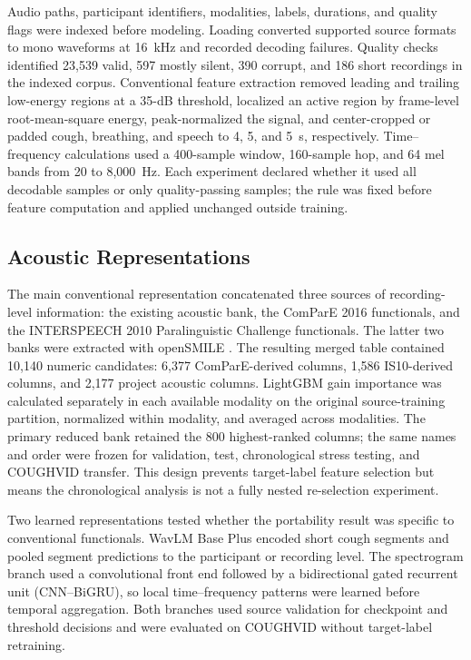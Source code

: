 Audio paths, participant identifiers, modalities, labels, durations, and
quality flags were indexed before modeling. Loading converted supported source
formats to mono waveforms at 16~kHz and recorded decoding failures. Quality
checks identified 23,539 valid, 597 mostly silent, 390 corrupt, and 186 short
recordings in the indexed corpus. Conventional feature extraction removed
leading and trailing low-energy regions at a 35-dB threshold, localized an
active region by frame-level root-mean-square energy, peak-normalized the
signal, and center-cropped or padded cough, breathing, and speech to 4, 5, and
5~s, respectively. Time--frequency calculations used a 400-sample window,
160-sample hop, and 64 mel bands from 20 to 8,000~Hz. Each experiment declared
whether it used all decodable samples or only quality-passing samples; the rule
was fixed before feature computation and applied unchanged outside training.

\subsection{Acoustic Representations}

The main conventional representation concatenated three sources of
recording-level information: the existing acoustic bank, the ComParE 2016
functionals, and the INTERSPEECH 2010 Paralinguistic Challenge functionals.
The latter two banks were extracted with openSMILE
\cite{eyben2010opensmile,schuller2010is10,schuller2013compare}.
The resulting merged table contained 10,140 numeric candidates: 6,377
ComParE-derived columns, 1,586 IS10-derived columns, and 2,177 project acoustic
columns. LightGBM gain importance \cite{ke2017lightgbm} was calculated separately in each available
modality on the original source-training partition, normalized within modality,
and averaged across modalities. The primary reduced bank retained the 800
highest-ranked columns; the same names and order were frozen for validation,
test, chronological stress testing, and COUGHVID transfer. This design prevents
target-label feature selection but means the chronological analysis is not a
fully nested re-selection experiment.

Two learned representations tested whether the portability result was specific
to conventional functionals. WavLM Base Plus encoded short cough segments and
pooled segment predictions to the participant or recording level. The
spectrogram branch used a convolutional front end followed by a bidirectional
gated recurrent unit (CNN--BiGRU), so local time--frequency patterns were
learned before temporal aggregation. Both branches used source validation for
checkpoint and threshold decisions and were evaluated on COUGHVID without
target-label retraining.

